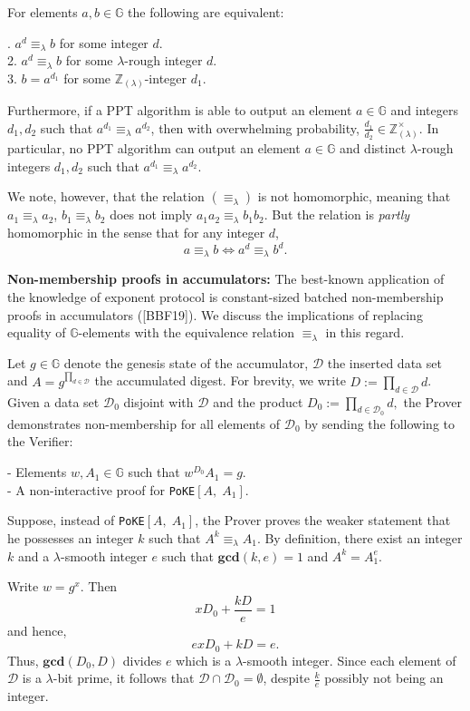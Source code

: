 \documentclass[11pt, lettersize, notitlepage, leqno, footskip=0.6cm]{article}
\newcommand{\bz}{\mathbb Z}
\newcommand{\pl}{\prod\limits}
\newcommand{\LRA}{\Longleftrightarrow}
\newcommand{\eqlam}{\equiv_{\lam}}
\newcommand{\mc}{\mathcal}
\newcommand{\mb}{\mathbb}
\newcommand{\mbf}{\mathbf}
\newcommand{\lam}{\lambda}
\newcommand{\bzlam}{\bz_{(\lam)}}
\newcommand{\vs}{\vspace{-0.15cm}}
\newcommand{\noin}{\noindent}
\newcommand{\op}{overwhelming probability}
\newcommand{\GCD}{\mbf{gcd}}
\numberwithin{equation}{section}
\begin{document}
For elements $a,b\in\mb{G}$ the following are equivalent:

\noin 1. $a^d\eqlam b$ for some integer $d$.\\
2. $a^d\eqlam b$ for some $\lam$-rough integer $d$.\\
3. $b = a^{d_1}$ for some $\bzlam$-integer $d_1$.

Furthermore, if a PPT algorithm is able to output an element $a\in\mb{G}$ and integers $d_1,d_2$ such that $a^{d_1}\eqlam a^{d_2}$, then with \op, $\frac{d_1}{d_2}\in\bzlam^{\times}$. In particular, no PPT algorithm can output an element $a\in \mb{G}$ and distinct $\lam$-rough integers $d_1,d_2$ such that $a^{d_1}\eqlam a^{d_2}$.

We note, however, that the relation $(\equiv_{\lam})$ is not homomorphic, meaning that $a_1 \equiv_{\lam} a_2$, $b_1 \equiv_{\lam} b_2$ does not imply $a_1a_2 \eqlam b_1b_2$. But the relation is \textit{partly} homomorphic in the sense that for any integer $d$, \vs $$ a \equiv_{\lam} b \LRA a^d \equiv_{\lam} b^d .$$ \vspace{0.1cm}


\noin \textbf{Non-membership proofs in accumulators:} The  best-known application of the knowledge of exponent protocol is constant-sized batched non-membership proofs in accumulators ([BBF19]). We discuss the implications of replacing equality of $\mb{G}$-elements with the equivalence relation $\eqlam$ in this regard. 

Let $g \in \mb{G}$ denote the genesis state of the accumulator, $\mc{D}$ the inserted data set and $A = g^{\pl_{d\in \mc{D}}}$ the accumulated digest. For brevity, we write $D:= \pl_{d\in \mc{D}} d$. Given a data set $\mc{D}_0$ disjoint with $\mc{D}$ and the product $D_0:= \pl_{d\in \mc{D}_0} d,$ the Prover demonstrates non-membership for all elements of $\mc{D}_0$ by sending the following to the Verifier:

\noin - Elements $w, A_1\in\mb{G}$ such that $w^{D_0}A_1 = g$.\\
- A non-interactive proof for \verb|PoKE|$[A,\; A_1]$.

Suppose, instead of \verb|PoKE|$[A,\; A_1]$, the Prover proves the weaker statement that he possesses an integer $k$ such that $A^k \eqlam A_1$. By definition, there exist an integer $k$ and a $\lam$-smooth integer $e$ such that $\GCD(k,e) = 1$ and $A^{k} = A_1^e$.

Write $w = g^x$. Then \vs $$ x D_0 +  
\frac{kD}{e} = 1 $$ and hence, \vs $$ex D_0 +  kD = e .$$ Thus, $\GCD(D_0, D)$ divides $e$ which is a $\lam$-smooth integer. Since each element of $\mc{D}$ is a $\lam$-bit prime, it follows that $\mc{D}\cap \mc{D}_0 = \emptyset$, despite $\frac{k}{e}$ possibly not being an integer.
\end{document}
